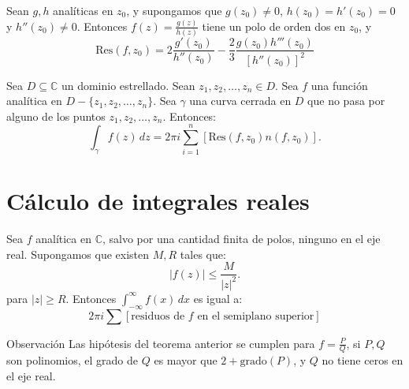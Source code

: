 \documentclass[spanish,presentation]{beamer}
\begin{document}
\begin{frame}[label=sec-1-3]{}
\begin{theorem}
Sean \(g,h\) analíticas en \(z_{0}\), y supongamos que
\(g(z_{0})\ne 0\), \(h(z_{0})=h'(z_{0})=0\) y \(h''(z_{0})\ne
    0\). Entonces \(f(z)=\frac{g(z)}{h(z)}\) tiene un polo de orden dos en
\(z_{0}\), y
\begin{displaymath}
\mathrm{Res}(f,z_{0})=2\frac{g'(z_{0})}{h''(z_{0})}-\frac{2}{3}\frac{g(z_{0})h'''(z_{0})}{[h''(z_{0})]^2}
\end{displaymath}    
\end{theorem}
\end{frame}

\begin{frame}[label=sec-1-4]{}
\begin{theorem}
Sea \(D\subseteq \mathbb{C}\) un dominio estrellado. Sean \(z_{1},
    z_{2},\ldots,z_{n}\in D\). Sea \(f\) una función analítica en
\(D-\{z_{1}, z_{2},\ldots,z_{n}\}\). Sea \(\gamma\) una curva
cerrada en \(D\) que no pasa por alguno de los puntos
\(z_{1},z_{2},\ldots,z_{n}\). Entonces:
\begin{displaymath}
\int_{\gamma}f(z)\,dz=2\pi i\sum_{i=1}^{n}[\mathrm{Res}(f,z_{0})n(f,z_{0})].
\end{displaymath}
\end{theorem}
\end{frame}

\section{Cálculo de integrales reales}
\label{sec:orgheadline1}

\begin{frame}[label=sec-2-1]{}
\begin{theorem}
Sea \(f\) analítica en \(\mathbb{C}\), salvo por una cantidad
finita de polos, ninguno en el eje real. Supongamos que existen
\(M,R\) tales que:
\begin{displaymath}
|f(z)| \leq \frac{M}{|z|^2}.
\end{displaymath}
para \(|z|\geq R\). Entonces \(\int_{-\infty}^{\infty}f(x)\,dx\)
es igual a:
\begin{displaymath}
2\pi i\sum [\text{residuos de \(f\) en el semiplano superior}]
\end{displaymath}
\end{theorem}

\begin{block}{Observación}
Las hipótesis del teorema anterior se cumplen para
\(f=\frac{P}{Q}\), si \(P,Q\) son polinomios, el grado de \(Q\) es
mayor que \(2+\mathrm{grado}(P)\), y \(Q\) no tiene ceros en el
eje real.
\end{block}
\end{frame}
\end{document}
